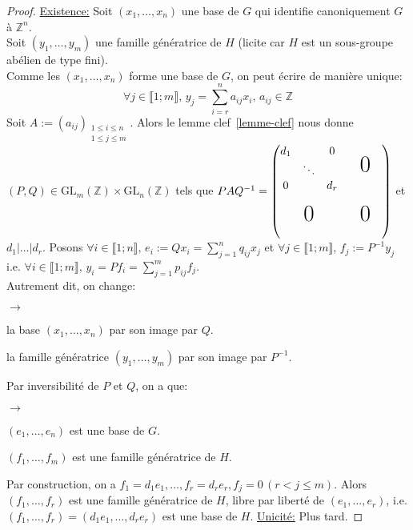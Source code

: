 \documentclass{report}
\newcommand{\Z}{\mathbb{Z}}
\newcommand{\x}{\times}
\newenvironment{ls}{\begin{list}{$\to$}{}}{\end{list}}
\newcommand{\nt}[1]{\llbracket  #1 \rrbracket }
\theoremstyle{definition}
\begin{document}
\begin{proof}
\underline{Existence:}
Soit $(x_1, \ldots, x_n)$ une base de $G$ qui identifie canoniquement $G$ \`a $\Z^n$.\\
Soit $(y_1, \ldots, y_m)$ une famille génératrice de $H$ (licite car $H$ est un sous-groupe abélien de type fini).\\
Comme les $(x_1, \ldots, x_n)$ forme une base de $G$, on peut \'ecrire de mani\`ere unique:
$$\forall j\in\nt{1;m},\, y_j=\sum_{i=r}^{n}a_{ij}x_i,\, a_{ij}\in\Z$$
Soit $A:=(a_{ij})_{\substack{1\leqslant i\leqslant n\\1\leqslant j\leqslant m}}$. Alors le lemme clef~\ref{lemme-clef} nous donne
$(P,Q) \in \textrm{GL}_m(\Z)\x\textrm{GL}_n(\Z)$ tels que $PAQ^{-1}=
\begin{pmatrix}
		\begin{matrix}d_1&&0\\
	  	&\ddots\\
      	0&&d_r\end{matrix}
	&& \text{\huge0}&\\
	&\\
    \text{\huge0} && \text{\huge0}\\
	&
\end{pmatrix}$ et $d_1|\ldots|d_r$. Posons $\forall i\in\nt{1;n},\, e_i:=Qx_i=\sum_{j=1}^nq_{ij}x_j$ et $\forall j\in\nt{1;m},\, f_j:=P^{-1}y_j$ i.e.
$\forall i\in\nt{1;m},\, y_i=Pf_i=\sum_{j=1}^mp_{ij}f_j$.\\
Autrement dit, on change:
\begin{ls}
\item la base $(x_1, \ldots, x_n)$ par son image par $Q$.
\item la famille g\'en\'eratrice $(y_1, \ldots, y_m)$ par son image par $P^{-1}$.
\end{ls}
Par inversibilit\'e de $P$ et $Q$, on a que:
\begin{ls}
\item $(e_1, \ldots, e_n)$ est une base de $G$.
\item $(f_1, \ldots, f_m)$ est une famille g\'en\'eratrice de $H$.
\end{ls}
Par construction, on a $f_1=d_1e_1,\ldots,f_r=d_re_r,f_j=0\,(r<j\leqslant m)$. Alors $(f_1,\ldots,f_r)$ est une famille g\'en\'eratrice de $H$,
libre par libert\'e de $(e_1, \ldots, e_r)$, i.e. $(f_1,\ldots,f_r)=(d_1e_1,\ldots,d_re_r)$ est une base de $H$.\medbreak
\underline{Unicit\'e:} Plus tard.
\end{proof}
\end{document}
